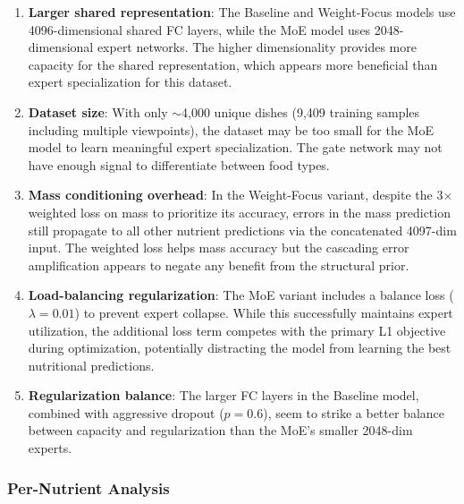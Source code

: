 \documentclass[11pt,a4paper]{article}
\begin{document}
\begin{enumerate}
  \item \textbf{Larger shared representation}: The Baseline and Weight-Focus models use 4096-dimensional shared FC layers, while the MoE model uses 2048-dimensional expert networks. The higher dimensionality provides more capacity for the shared representation, which appears more beneficial than expert specialization for this dataset.

  \item \textbf{Dataset size}: With only $\sim$4,000 unique dishes (9,409 training samples including multiple viewpoints), the dataset may be too small for the MoE model to learn meaningful expert specialization. The gate network may not have enough signal to differentiate between food types.

  \item \textbf{Mass conditioning overhead}: In the Weight-Focus variant, despite the 3$\times$ weighted loss on mass to prioritize its accuracy, errors in the mass prediction still propagate to all other nutrient predictions via the concatenated 4097-dim input. The weighted loss helps mass accuracy but the cascading error amplification appears to negate any benefit from the structural prior.

  \item \textbf{Load-balancing regularization}: The MoE variant includes a balance loss ($\lambda = 0.01$) to prevent expert collapse. While this successfully maintains expert utilization, the additional loss term competes with the primary L1 objective during optimization, potentially distracting the model from learning the best nutritional predictions.

  \item \textbf{Regularization balance}: The larger FC layers in the Baseline model, combined with aggressive dropout ($p = 0.6$), seem to strike a better balance between capacity and regularization than the MoE's smaller 2048-dim experts.
\end{enumerate}

\subsubsection{Per-Nutrient Analysis}
\end{document}

